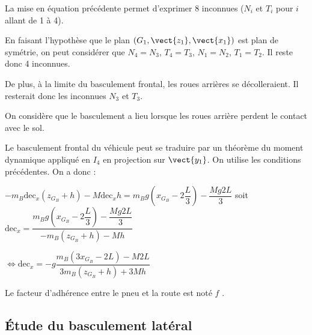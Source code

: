 \begin{multicols}{2}
\begin{corrige}
\end{corrige}
\else
\fi

\ifprof
\begin{corrige}
La mise en équation précédente permet d'exprimer 8 inconnues ($N_i$ et $T_i$ pour $i$ allant de 1 à 4).

En faisant l'hypothèse que le plan $\left(G_1,\vect{z_1},\vect{x_1}\right)$ est plan de symétrie, on peut considérer que $N_4=N_3$, $T_4=T_3$, $N_1=N_2$, $T_1=T_2$. Il reste donc 4 inconnues. 

De plus, à la limite du basculement frontal, les roues arrières se décolleraient. Il resterait donc les inconnues $N_3$ et $T_3$. 
\end{corrige}
\else
\fi

On considère que le basculement a lieu lorsque les roues arrière perdent le contact avec le sol.

\ifprof
\begin{corrige}
Le basculement frontal du véhicule peut se traduire par un théorème du moment dynamique appliqué en $I_4$ en projection sur $\vect{y_1}$. On utilise les conditions précédentes. On a donc : 
 
 $-m_B \text{dec}_x \left(z_{G_B}+h\right)-M\text{dec}_x h=m_B g\left(x_{G_B}-2\dfrac{L}{3}\right)-\dfrac{M g2L}{3}$ soit 
 $\text{dec}_x  = \dfrac{m_B g\left(x_{G_B}-2\dfrac{L}{3}\right)-\dfrac{M g2L}{3}}{-m_B  \left(z_{G_B}+h\right)-M h}$
 
 $ \Leftrightarrow \text{dec}_x  = -g\dfrac{m_B \left(3x_{G_B}-2L\right)-M 2L}{3m_B  \left(z_{G_B}+h\right)+3M h}$
\end{corrige}
\else
\fi

Le facteur d’adhérence entre le pneu et la route est noté $f$ .

\ifprof
\begin{corrige}
\end{corrige}
\else
\fi


\subsection*{Étude du basculement latéral}


\end{multicols}
